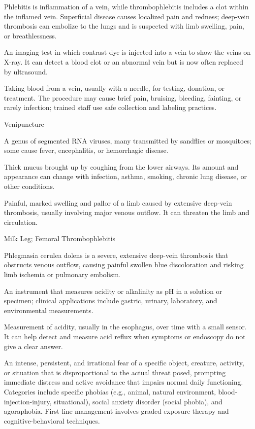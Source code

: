  Phlebitis is inflammation of a vein, while thrombophlebitis includes a clot within the inflamed vein. Superficial disease causes localized pain and redness; deep-vein thrombosis can embolize to the lungs and is suspected with limb swelling, pain, or breathlessness.

 An imaging test in which contrast dye is injected into a vein to show the veins on X-ray. It can detect a blood clot or an abnormal vein but is now often replaced by ultrasound.

 Taking blood from a vein, usually with a needle, for testing, donation, or treatment. The procedure may cause brief pain, bruising, bleeding, fainting, or rarely infection; trained staff use safe collection and labeling practices.

\synonyms
Venipuncture

 A genus of segmented RNA viruses, many transmitted by sandflies or mosquitoes; some cause fever, encephalitis, or hemorrhagic disease.

 Thick mucus brought up by coughing from the lower airways. Its amount and appearance can change with infection, asthma, smoking, chronic lung disease, or other conditions.

 Painful, marked swelling and pallor of a limb caused by extensive deep-vein thrombosis, usually involving major venous outflow. It can threaten the limb and circulation.

\synonyms
Milk Leg; Femoral Thrombophlebitis

 Phlegmasia cerulea dolens is a severe, extensive deep-vein thrombosis that obstructs venous outflow, causing painful swollen blue discoloration and risking limb ischemia or pulmonary embolism.

 An instrument that measures acidity or alkalinity as pH in a solution or specimen; clinical applications include gastric, urinary, laboratory, and environmental measurements.

 Measurement of acidity, usually in the esophagus, over time with a small sensor. It can help detect and measure acid reflux when symptoms or endoscopy do not give a clear answer.

 An intense, persistent, and irrational fear of a specific object, creature, activity, or situation that is disproportional to the actual threat posed, prompting immediate distress and active avoidance that impairs normal daily functioning. Categories include specific phobias (e.g., animal, natural environment, blood-injection-injury, situational), social anxiety disorder (social phobia), and agoraphobia. First-line management involves graded exposure therapy and cognitive-behavioral techniques.


